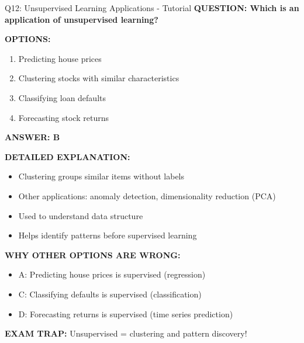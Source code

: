 \documentclass[8pt]{beamer}
\begin{document}
	\begin{frame}{Q12: Unsupervised Learning Applications - Tutorial}
		\fontsize{6.5}{7.5}\selectfont
		\textbf{QUESTION: Which is an application of unsupervised learning?}
		
		\vspace{0.1cm}
		\textbf{OPTIONS:}
		\begin{enumerate}
			\item Predicting house prices
			\item Clustering stocks with similar characteristics
			\item Classifying loan defaults
			\item Forecasting stock returns
		\end{enumerate}
		
		\vspace{0.1cm}
		\textcolor{myblue}{\textbf{ANSWER: B}}
		
		\vspace{0.1cm}
		\textbf{DETAILED EXPLANATION:}
		\begin{itemize}
			\item Clustering groups similar items without labels
			\item Other applications: anomaly detection, dimensionality reduction (PCA)
			\item Used to understand data structure
			\item Helps identify patterns before supervised learning
		\end{itemize}
		
		\vspace{0.1cm}
		\textcolor{myred}{\textbf{WHY OTHER OPTIONS ARE WRONG:}}
		\begin{itemize}
			\item \textcolor{myred}{A:} Predicting house prices is supervised (regression)
			\item \textcolor{myred}{C:} Classifying defaults is supervised (classification)
			\item \textcolor{myred}{D:} Forecasting returns is supervised (time series prediction)
		\end{itemize}
		
		\textcolor{myred}{\textbf{EXAM TRAP:}} Unsupervised = \textcolor{myblue}{clustering and pattern discovery}!
	\end{frame}
	
\end{document}
